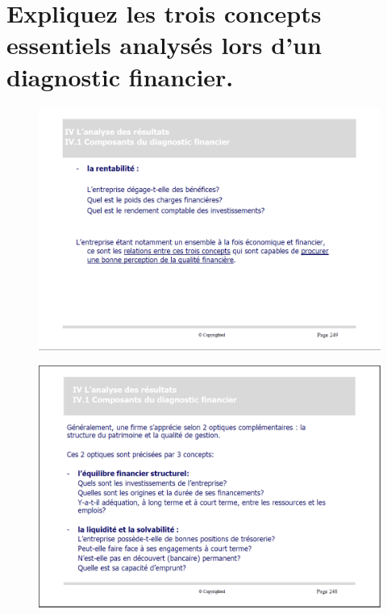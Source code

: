 \documentclass{article}
\begin{document}
\section{Expliquez les trois concepts essentiels analysés lors d’un diagnostic financier.}
\begin{figure}[H]
	\centering
	\includegraphics[width=14cm]{diagnostic.png}
\end{figure}
\begin{figure}[H]
	\centering
	\includegraphics[width=14cm]{diagnostic2.png}
\end{figure}
\end{document}
